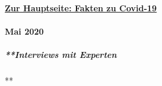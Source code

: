 \hypertarget{zur-hauptseite-fakten-zu-covid-19}{%
\paragraph{\texorpdfstring{\href{https://swprs.org/covid-19-hinweis-ii/}{Zur
Hauptseite: Fakten zu
Covid-19}}{Zur Hauptseite: Fakten zu Covid-19}}\label{zur-hauptseite-fakten-zu-covid-19}}

\hypertarget{mai-2020}{%
\paragraph{Mai 2020}\label{mai-2020}}

\hypertarget{interviews-mit-experten}{%
\subparagraph{**Interviews mit Experten}\label{interviews-mit-experten}}

**

